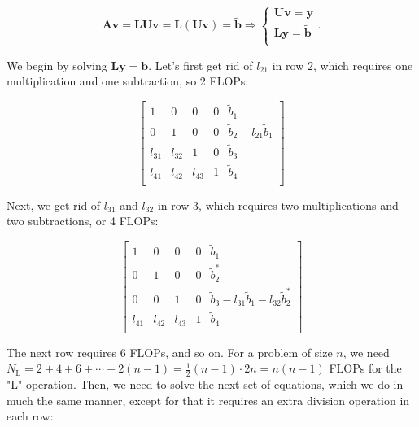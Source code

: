 \documentclass[]{article}
\begin{document}
\begin{equation*}
\mathbf{Av} = \mathbf{LUv} = \mathbf{L}(\mathbf{Uv}) = \mathbf{\tilde{b}} 
\Rightarrow 
\begin{cases} 
\mathbf{Uv} = \mathbf{y} \\
\mathbf{Ly} = \mathbf{\tilde{b}} \\
\end{cases}
\text{.}
\end{equation*}

We begin by solving $\mathbf{Ly} = \mathbf{b}$. Let's first get rid of $l_{21}$ in row 2, which requires one multiplication and one subtraction, so 2 FLOPs:

\begin{equation*}
\left[ \begin{array}{cccc|c}
	     1 &      0 &      0 & 0 & \tilde{b}_1  \\
	     0 &      1 &      0 & 0 & \tilde{b}_2 - l_{21}\tilde{b}_1   \\
	l_{31} & l_{32} &      1 & 0 & \tilde{b}_3  \\
	l_{41} & l_{42} & l_{43} & 1 & \tilde{b}_4    \\
\end{array} \right]
\end{equation*}

Next, we get rid of $l_{31}$ and $l_{32}$ in row 3, which requires two  multiplications and two subtractions, or 4 FLOPs:

\begin{equation*}
\left[ \begin{array}{cccc|c}
1 &      0 &      0 & 0 & \tilde{b}_1  \\
0 &      1 &      0 & 0 & \tilde{b}_{2}^{\ast}   \\
0 &      0 &      1 & 0 & \tilde{b}_3 - l_{31}\tilde{b}_{1}- l_{32}\tilde{b}_{2}^{\ast}   \\
l_{41} & l_{42} & l_{43} & 1 & \tilde{b}_4    \\
\end{array} \right]
\end{equation*}

The next row requires 6 FLOPs, and so on. For a problem of size $n$, we need $N_{\text{L}} = 2+4+6+\cdots+2(n-1) = \frac{1}{2}(n-1) \cdot 2n = n(n-1)$ FLOPs for the "L" operation. Then, we need to solve the next set of equations, which we do in much the same manner, except for that it requires an extra division operation in each row: 
\end{document}
